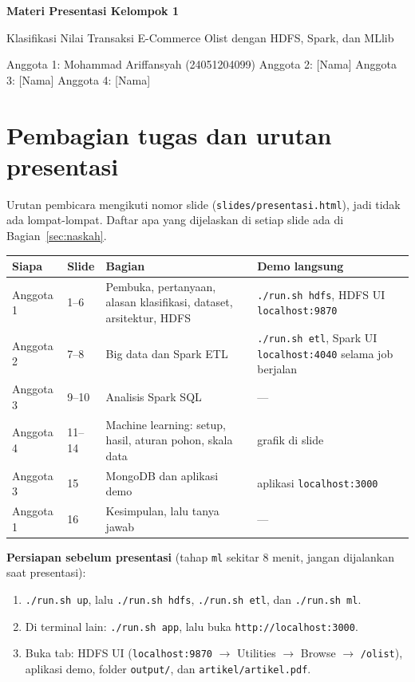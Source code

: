 \documentclass[11pt,a4paper]{article}
\newcommand{\f}[1]{\texttt{#1}}
\begin{document}
{\LARGE\bfseries Materi Presentasi Kelompok 1\par}
\vspace{2pt}
{\large Klasifikasi Nilai Transaksi E-Commerce Olist dengan HDFS, Spark, dan MLlib\par}
\vspace{4pt}
Anggota 1: Mohammad Ariffansyah (24051204099) \quad Anggota 2: [Nama] \quad
Anggota 3: [Nama] \quad Anggota 4: [Nama]

\section{Pembagian tugas dan urutan presentasi}
Urutan pembicara mengikuti nomor slide (\f{slides/presentasi.html}), jadi tidak ada
lompat-lompat. Daftar apa yang dijelaskan di setiap slide ada di Bagian~\ref{sec:naskah}.

\begin{tabularx}{\textwidth}{P{2.1cm}P{1.9cm}YP{4.6cm}}
\toprule
Siapa & Slide & Bagian & Demo langsung \\
\midrule
Anggota 1 & 1--6 & Pembuka, pertanyaan, alasan klasifikasi, dataset, arsitektur, HDFS & \f{./run.sh hdfs}, HDFS UI \f{localhost:9870} \\
Anggota 2 & 7--8 & Big data dan Spark ETL & \f{./run.sh etl}, Spark UI \f{localhost:4040} selama job berjalan \\
Anggota 3 & 9--10 & Analisis Spark SQL & --- \\
Anggota 4 & 11--14 & Machine learning: setup, hasil, aturan pohon, skala data & grafik di slide \\
Anggota 3 & 15 & MongoDB dan aplikasi demo & aplikasi \f{localhost:3000} \\
Anggota 1 & 16 & Kesimpulan, lalu tanya jawab & --- \\
\bottomrule
\end{tabularx}

\textbf{Persiapan sebelum presentasi} (tahap \f{ml} sekitar 8 menit, jangan dijalankan saat presentasi):
\begin{enumerate}
\item \f{./run.sh up}, lalu \f{./run.sh hdfs}, \f{./run.sh etl}, dan \f{./run.sh ml}.
\item Di terminal lain: \f{./run.sh app}, lalu buka \f{http://localhost:3000}.
\item Buka tab: HDFS UI (\f{localhost:9870} $\rightarrow$ Utilities $\rightarrow$ Browse $\rightarrow$
  \f{/olist}), aplikasi demo, folder \f{output/}, dan \f{artikel/artikel.pdf}.
\end{enumerate}
\end{document}
